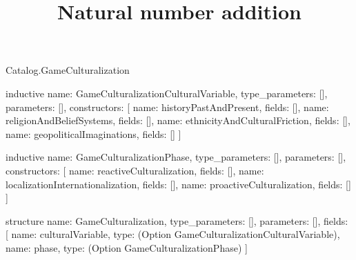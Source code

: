 \begin{lexlean}{Catalog.GameCulturalization}
\title{Natural number addition}
\begin{semanticmodule}
inductive{
  name: GameCulturalizationCulturalVariable,
  type_parameters: [],
  parameters: [],
  constructors: [
    {name: historyPastAndPresent, fields: []},
    {name: religionAndBeliefSystems, fields: []},
    {name: ethnicityAndCulturalFriction, fields: []},
    {name: geopoliticalImaginations, fields: []}
  ]
}

inductive{
  name: GameCulturalizationPhase,
  type_parameters: [],
  parameters: [],
  constructors: [
    {name: reactiveCulturalization, fields: []},
    {name: localizationInternationalization, fields: []},
    {name: proactiveCulturalization, fields: []}
  ]
}

structure{
  name: GameCulturalization,
  type_parameters: [],
  parameters: [],
  fields: [
    {name: culturalVariable, type: (Option GameCulturalizationCulturalVariable)},
    {name: phase, type: (Option GameCulturalizationPhase)}
  ]
}
\end{semanticmodule}
\end{lexlean}
